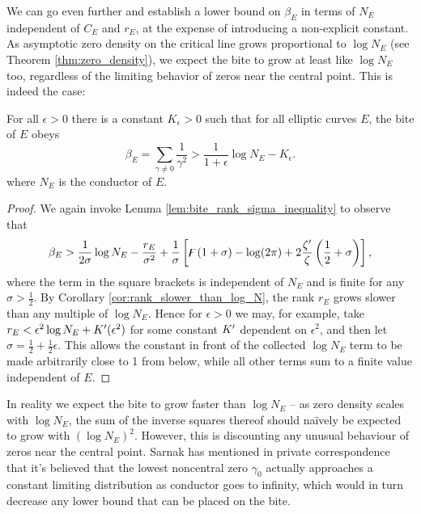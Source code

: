 We can go even further and establish a lower bound on $\beta_E$ in terms of $N_E$ independent of $C_E$ and $r_E$, at the expense of introducing a non-explicit constant. As asymptotic zero density on the critical line grows proportional to $\log N_E$ (see Theorem \ref{thm:zero_density}), we expect the bite to grow at least like $\log N_E$ too, regardless of the limiting behavior of zeros near the central point. This is indeed the case:
\begin{proposition}[GRH]
For all $\epsilon>0$ there is a constant $K_{\epsilon}>0$ such that for all elliptic curves $E$, the bite of $E$ obeys
\begin{equation}\label{eqn:bite_lower_bound}
\beta_E = \sum_{\gamma\ne 0} \frac{1}{\gamma^2} > \frac{1}{1+\epsilon} \log N_E - K_{\epsilon}.
\end{equation}
where $N_E$ is the conductor of $E$.
\end{proposition}
\begin{proof}
We again invoke Lemma \ref{lem:bite_rank_sigma_inequality} to observe that
\begin{equation}
\beta_E > \frac{1}{2\sigma} \log N_E - \frac{r_E}{\sigma^2} + \frac{1}{\sigma}\left[\digamma(1+\sigma)-\log(2\pi) + 2\frac{\zeta^{\prime}}{\zeta}\left(\frac{1}{2}+\sigma\right)\right],
\end{equation}
where the term in the square brackets is independent of $N_E$ and is finite for any $\sigma>\frac{1}{2}$. By Corollary \ref{cor:rank_slower_than_log_N}, the rank $r_E$ grows slower than any multiple  of $\log N_E$. Hence for $\epsilon > 0$ we may, for example, take $r_E < \epsilon^2 \log N_E + K^{\prime}(\epsilon^2)$ for some constant $K^{\prime}$ dependent on $\epsilon^2$, and then let $\sigma = \frac{1}{2}+\frac{1}{2}\epsilon$. This allows the constant in front of the collected $\log N_E$ term to be made arbitrarily close to 1 from below, while all other terms sum to a finite value independent of $E$.
\end{proof}

In reality we expect the bite to grow faster than $\log N_E$ -- as zero density scales with $\log N_E$, the sum of the inverse squares thereof should na\"{i}vely be expected to grow with $(\log N_E)^2$. However, this is discounting any unusual behaviour of zeros near the central point. Sarnak has mentioned in private correspondence that it's believed that the lowest noncentral zero $\gamma_0$ actually approaches a constant limiting distribution as conductor goes to infinity, which would in turn decrease any lower bound that can be placed on the bite. \\

